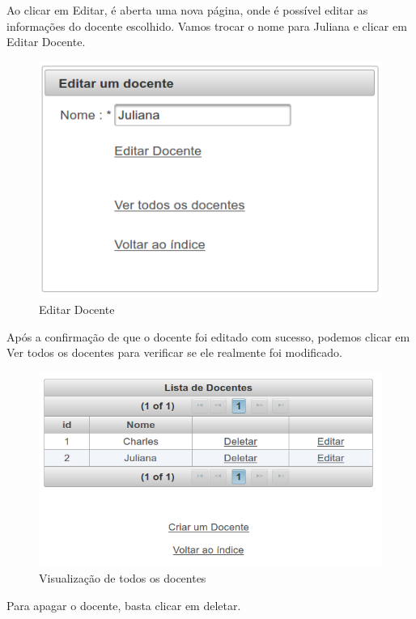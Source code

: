 \documentclass[12pt,a4paper]{article}
\begin{document}
Ao clicar em Editar, é aberta uma nova página, onde é possível editar as informações do docente escolhido. Vamos trocar o nome para Juliana e clicar em Editar Docente.
\begin{figure}[H]
    \centering
    \includegraphics[scale=0.45]{editarDocente2.png}
    \caption{Editar Docente}
    \label{editarDocente2}
\end{figure}

Após a confirmação de que o docente foi editado com sucesso, podemos clicar em Ver todos os docentes para verificar se ele realmente foi modificado.

\begin{figure}[H]
    \centering
    \includegraphics[scale=0.45]{visualizarDocente3.png}
    \caption{Visualização de todos os docentes}
    \label{visualizarDocente3}
\end{figure}

Para apagar o docente, basta clicar em deletar.
\end{document}
